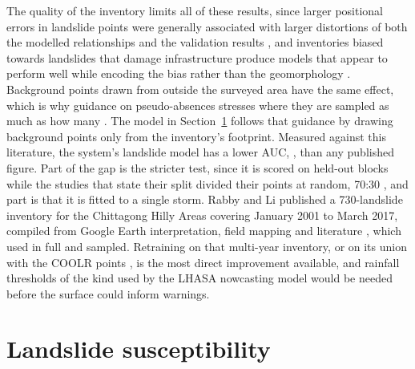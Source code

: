 The quality of the inventory limits all of these results, since larger positional errors in landslide points were generally associated with larger distortions of both the modelled relationships and the validation results \citep{steger2016}, and inventories biased towards landslides that damage infrastructure produce models that appear to perform well while encoding the bias rather than the geomorphology \citep{steger2021}. Background points drawn from outside the surveyed area have the same effect, which is why guidance on pseudo-absences stresses where they are sampled as much as how many \citep{barbetmassin2012}. The model in Section~\ref{sec:landslide} follows that guidance by drawing background points only from the inventory's footprint. Measured against this literature, the system's landslide model has a lower AUC, \CHTLSAUC{}, than any published figure. Part of the gap is the stricter test, since it is scored on held-out blocks while the studies that state their split divided their points at random, 70:30 \citep{islama2025, hasanm2024}, and part is that it is fitted to a single storm. Rabby and Li published a 730-landslide inventory for the Chittagong Hilly Areas covering January 2001 to March 2017, compiled from Google Earth interpretation, field mapping and literature \citep{rabby2019}, which \citet{hossain2025} used in full and \citet{roy2025} sampled. Retraining on that multi-year inventory, or on its union with the COOLR points \citep{juang2019}, is the most direct improvement available, and rainfall thresholds of the kind used by the LHASA nowcasting model \citep{kirschbaum2018} would be needed before the surface could inform warnings.

\section{Landslide susceptibility}
\label{sec:landslide}


